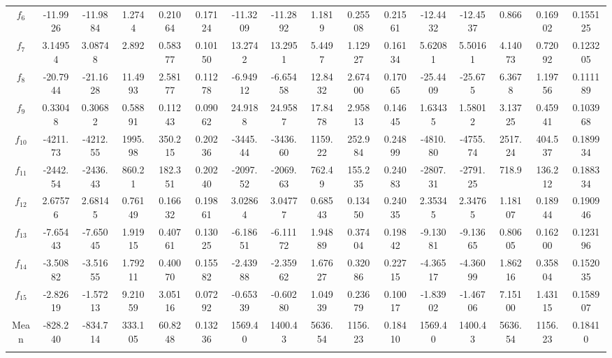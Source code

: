 \documentclass[paper=a4, fontsize=11pt]{scrartcl} %
\numberwithin{equation}{section} %
\numberwithin{figure}{section} %
\numberwithin{table}{section} %
\begin{document}
\begin{landscape}
\begin{table}
\begin{tabular}{c|ccccc|ccccc|ccccc}
			$f_{6}$  & -11.9926 & -11.9884 & 1.2744  & 0.21064 & 0.17124 & -11.3209 & -11.2892 & 1.1819  & 0.25508 & 0.21561 & -12.4432 & -12.4537 & 0.866   & 0.16902 & 0.155125\\
			$f_{7}$  &  3.14954 &  3.08748 & 2.892   & 0.58377 & 0.10150 &  13.2742 &  13.2951 & 5.4497  & 1.12927 & 0.16134 &  5.62081 &  5.50161 & 4.14073 & 0.72092 & 0.123205\\
			$f_{8}$  & -20.7944 & -21.1628 & 11.4993 & 2.58177 & 0.11278 & -6.94912 & -6.65458 & 12.8432 & 2.67400 & 0.17065 & -25.4409 & -25.675  & 6.3678  & 1.19756 & 0.111189\\
			$f_{9}$  &  0.33048 &  0.30682 & 0.58891 & 0.11243 & 0.09062 &  24.9188 &  24.9587 & 17.8478 & 2.95813 & 0.14645 &  1.63435 &  1.58012 & 3.13725 & 0.45941 & 0.103968\\
			$f_{10}$ & -4211.73 & -4212.55 & 1995.98 & 350.215 & 0.20236 & -3445.44 & -3436.60 & 1159.22 & 252.984 & 0.24899 & -4810.80 & -4755.74 & 2517.24 & 404.537 & 0.189934\\
			$f_{11}$ & -2442.54 & -2436.43 & 860.21  & 182.351 & 0.20240 & -2097.52 & -2069.63 & 762.49  & 155.235 & 0.24083 & -2807.31 & -2791.25 & 718.9   & 136.212 & 0.188334\\
			$f_{12}$ &  2.67576 &  2.68145 & 0.76149 & 0.16632 & 0.19861 &  3.02864 &  3.04777 & 0.68543 & 0.13450 & 0.24035 &  2.35345 &  2.34765 & 1.18107 & 0.18944 & 0.190946\\
			$f_{13}$ & -7.65443 & -7.65045 & 1.91915 & 0.40761 & 0.13025 & -6.18651 & -6.11172 & 1.94889 & 0.37404 & 0.19842 & -9.13081 & -9.13665 & 0.80605 & 0.16200 & 0.123196\\
			$f_{14}$ & -3.50882 & -3.51655 & 1.79211 & 0.40070 & 0.15582 & -2.43988 & -2.35962 & 1.67627 & 0.32086 & 0.22715 & -4.36517 & -4.36099 & 1.86216 & 0.35804 & 0.152035\\
			$f_{15}$ & -2.82619 & -1.57213 & 9.21059 & 3.05116 & 0.07292 & -0.65339 & -0.60280 & 1.04939 & 0.23679 & 0.10017 & -1.83902 & -1.46706 & 7.15100 & 1.43115 & 0.158907\\
			
			\noalign{\smallskip}\hline\noalign{\smallskip}
			Mean & -828.240 & -834.714 & 333.105 & 60.8248 & 0.13236 & 1569.40 & 1400.43 & 5636.54 & 1156.23 & 0.18410 & 1569.40 & 1400.43 & 5636.54 & 1156.23 & 0.18410 \\
			\noalign{\smallskip}\hline\noalign{\smallskip}
			\multicolumn{16}{l}{\tiny $^1$ 3.2GHz AMD Ryzen 7 1700X, 16 GB RAM}
		\end{tabular}\label{DE_10}
	\end{table}
\end{landscape}
\end{document}
